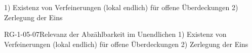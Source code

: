 1) Existenz von Verfeinerungen (lokal endlich) für offene Überdeckungen
2) Zerlegung der Eins

\begin{REM}{RG-1-05-07}{Relevanz der Abzählbarkeit im Unendlichen
1) Existenz von Verfeinerungen (lokal endlich) für offene Überdeckungen
2) Zerlegung der Eins}
\end{REM}

